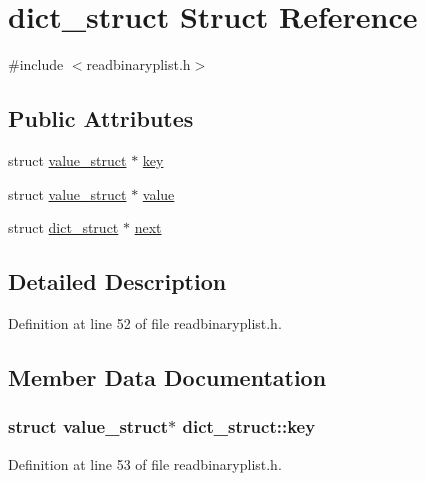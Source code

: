 \hypertarget{structdict__struct}{}\section{dict\+\_\+struct Struct Reference}
\label{structdict__struct}


{\ttfamily \#include $<$readbinaryplist.\+h$>$}

\subsection*{Public Attributes}
\begin{DoxyCompactItemize}
\item 
struct \hyperlink{structvalue__struct}{value\+\_\+struct} $\ast$ \hyperlink{structdict__struct_a906ac1c2d1ef832872d21a370fd889b2}{key}
\item 
struct \hyperlink{structvalue__struct}{value\+\_\+struct} $\ast$ \hyperlink{structdict__struct_a8f0a429176b1c1a0eabb9e1e73d228a1}{value}
\item 
struct \hyperlink{structdict__struct}{dict\+\_\+struct} $\ast$ \hyperlink{structdict__struct_adc33b2f20c741e3cde74fbdda543f69b}{next}
\end{DoxyCompactItemize}


\subsection{Detailed Description}


Definition at line 52 of file readbinaryplist.\+h.



\subsection{Member Data Documentation}
\subsubsection[{\texorpdfstring{key}{key}}]{\setlength{\rightskip}{0pt plus 5cm}struct {\bf value\+\_\+struct}$\ast$ dict\+\_\+struct\+::key}\hypertarget{structdict__struct_a906ac1c2d1ef832872d21a370fd889b2}{}\label{structdict__struct_a906ac1c2d1ef832872d21a370fd889b2}


Definition at line 53 of file readbinaryplist.\+h.

